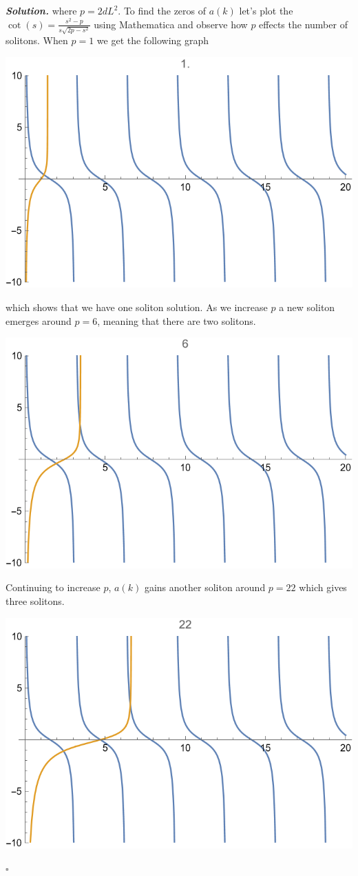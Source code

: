 \documentclass[12pt]{report}
\newenvironment{solution}[1][\it{Solution}]{\textbf{#1. } }{$\square$}
\begin{document}
\begin{solution}
    where $p = 2dL^2.$ To find the zeros of $a(k)$ let's plot the $\cot(s) = \frac{s^2 - p}{s\sqrt{2p - s^2}}$ using Mathematica and observe how $p$ effects the number of solitons. When $p = 1$ we get the following graph
    \begin{center}
        \includegraphics[width=.6\textwidth]{plots/case1.png}
    \end{center} 
    which shows that we have one soliton solution. As we increase $p$ a new soliton emerges around $p = 6$, meaning that there are two solitons. 
    \begin{center}
        \includegraphics[width=.6\textwidth]{plots/case2.png}
    \end{center} 
    Continuing to increase $p$, $a(k)$ gains another soliton around $p=22$ which gives three solitons. 
    \begin{center}
        \includegraphics[width=.6\textwidth]{plots/case3.png}
    \end{center} 

\end{solution}
\end{document}
